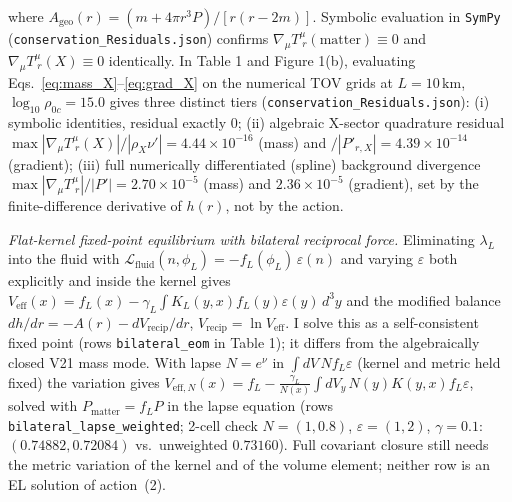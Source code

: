 \documentclass[10pt,a4paper]{article}
\begin{document}
where $A_{\text{geo}}(r) = (m + 4\pi r^3 P)/[r(r-2m)]$. Symbolic evaluation in \texttt{SymPy} (\texttt{conservation\_Residuals.json}) confirms $\nabla_\mu T^\mu_{\;r}(\text{matter}) \equiv 0$ and $\nabla_\mu T^\mu_{\;r}(X) \equiv 0$ identically. In Table 1 and Figure 1(b), evaluating Eqs.~\eqref{eq:mass_X}--\eqref{eq:grad_X} on the numerical TOV grids at $L=10\,\text{km}$, $\log_{10}\rho_{0c}=15.0$ gives three distinct tiers (\texttt{conservation\_Residuals.json}): (i) symbolic identities, residual exactly $0$; (ii) algebraic X-sector quadrature residual $\max|\nabla_\mu T^\mu_{\;r}(X)|/|\rho_X\nu'| = 4.44\times 10^{-16}$ (mass) and $/|P'_{r,X}| = 4.39\times 10^{-14}$ (gradient); (iii) full numerically differentiated (spline) background divergence $\max|\nabla_\mu T^\mu_{\;r}|/|P'| = 2.70\times 10^{-5}$ (mass) and $2.36\times 10^{-5}$ (gradient), set by the finite-difference derivative of $h(r)$, not by the action.

\emph{Flat-kernel fixed-point equilibrium with bilateral reciprocal force.} Eliminating $\lambda_L$ into the fluid with $\mathcal{L}_{\text{fluid}}(n,\phi_L) = -f_L(\phi_L)\,\varepsilon(n)$ and varying $\varepsilon$ both explicitly and inside the kernel gives $V_{\text{eff}}(x) = f_L(x) - \gamma_L\!\int K_L(y,x) f_L(y)\varepsilon(y)\,d^3y$ and the modified balance $dh/dr = -A(r) - dV_{\text{recip}}/dr$, $V_{\text{recip}} = \ln V_{\text{eff}}$. I solve this as a self-consistent fixed point (rows \texttt{bilateral\_eom} in Table 1); it differs from the algebraically closed V21 mass mode. With lapse $N=e^\nu$ in $\int dV\,N f_L\varepsilon$ (kernel and metric held fixed) the variation gives $V_{\text{eff},N}(x)=f_L-\frac{\gamma_L}{N(x)}\!\int dV_y\,N(y)K(y,x)f_L\varepsilon$, solved with $P_{\text{matter}}=f_LP$ in the lapse equation (rows \texttt{bilateral\_lapse\_weighted}; 2-cell check $N=(1,0.8)$, $\varepsilon=(1,2)$, $\gamma=0.1$: $(0.74882,0.72084)$ vs.\ unweighted $0.73160$). Full covariant closure still needs the metric variation of the kernel and of the volume element; neither row is an EL solution of action~(2).
\end{document}
